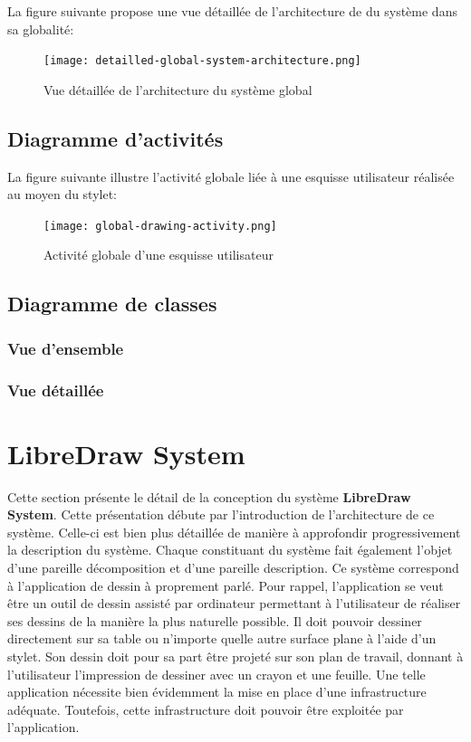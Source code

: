 \documentclass[11pt,a4paper,oldfontcommands]{memoir}
\begin{document}
La figure suivante propose une vue détaillée de l'architecture de du système dans sa globalité:

\begin{figure}[H]
\centering
\texttt{[image: detailled-global-system-architecture.png]}
\caption{Vue détaillée de l'architecture du système global}
\end{figure}

\newpage

\subsection{Diagramme d'activités}

La figure suivante illustre l'activité globale liée à une esquisse utilisateur réalisée au moyen du stylet:

\begin{figure}[H]
\centering
\texttt{[image: global-drawing-activity.png]}
\caption{Activité globale d'une esquisse utilisateur}
\end{figure}

\subsection{Diagramme de classes}

\subsubsection{Vue d'ensemble}

\subsubsection{Vue détaillée}

\newpage

\section{LibreDraw System}

Cette section présente le détail de la conception du système \textbf{LibreDraw System}. Cette présentation débute par l'introduction de l'architecture de ce système. Celle-ci est bien plus détaillée de manière à approfondir progressivement la description du système. Chaque constituant du système fait également l'objet d'une pareille décomposition et d'une pareille description. Ce système correspond à l'application de dessin à proprement parlé. Pour rappel, l'application se veut être un outil de dessin assisté par ordinateur permettant à l'utilisateur de réaliser ses dessins de la manière la plus naturelle possible. Il doit pouvoir dessiner directement sur sa table ou n'importe quelle autre surface plane à l'aide d'un stylet. Son dessin doit pour sa part être projeté sur son plan de travail, donnant à l'utilisateur l'impression de dessiner avec un crayon et une feuille. Une telle application nécessite bien évidemment la mise en place d'une infrastructure adéquate. Toutefois, cette infrastructure doit pouvoir être exploitée par l'application.
\end{document}
